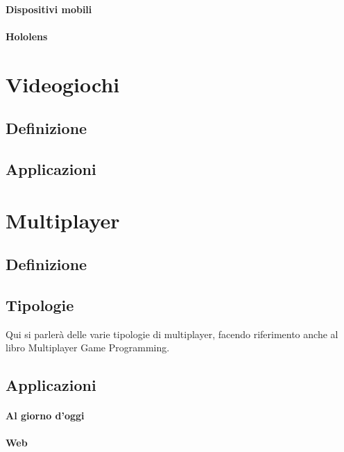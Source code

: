         \paragraph{Dispositivi mobili}

        \paragraph{Hololens}

\section{Videogiochi}\label{sec:Videogiochi}
    \subsection{Definizione}\label{subsec:VideogiochiDef}
    \subsection{Applicazioni}\label{subsec:VideogiochiTipologie}

\section{Multiplayer}\label{sec:Multiplayer}
    \subsection{Definizione}\label{subsec:MultiDef}
    \subsection{Tipologie}\label{subsec:MultiTipologie}
    Qui si parlerà delle varie tipologie di multiplayer, facendo riferimento anche al libro Multiplayer Game Programming.
    \subsection{Applicazioni}\label{subsec:CoopApplicazioni}
        \paragraph{Al giorno d'oggi}\label{par:MultiOggi}
        \paragraph{Web}\label{par:CoopWeb}
